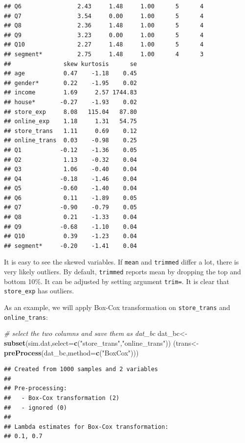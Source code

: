 \documentclass[12pt,]{krantz}
\newenvironment{Shaded}{\begin{snugshade}}{\end{snugshade}}
\newcommand{\KeywordTok}[1]{\textcolor[rgb]{0.13,0.29,0.53}{\textbf{{#1}}}}
\newcommand{\DataTypeTok}[1]{\textcolor[rgb]{0.13,0.29,0.53}{{#1}}}
\newcommand{\StringTok}[1]{\textcolor[rgb]{0.31,0.60,0.02}{{#1}}}
\newcommand{\CommentTok}[1]{\textcolor[rgb]{0.56,0.35,0.01}{\textit{{#1}}}}
\newcommand{\NormalTok}[1]{{#1}}
\theoremstyle{definition}
\theoremstyle{definition}
\theoremstyle{remark}
\begin{document}
\begin{verbatim}
## Q6                2.43     1.48     1.00      5      4
## Q7                3.54     0.00     1.00      5      4
## Q8                2.36     1.48     1.00      5      4
## Q9                3.23     0.00     1.00      5      4
## Q10               2.27     1.48     1.00      5      4
## segment*          2.75     1.48     1.00      4      3
##               skew kurtosis      se
## age           0.47    -1.18    0.45
## gender*       0.22    -1.95    0.02
## income        1.69     2.57 1744.83
## house*       -0.27    -1.93    0.02
## store_exp     8.08   115.04   87.80
## online_exp    1.18     1.31   54.75
## store_trans   1.11     0.69    0.12
## online_trans  0.03    -0.98    0.25
## Q1           -0.12    -1.36    0.05
## Q2            1.13    -0.32    0.04
## Q3            1.06    -0.40    0.04
## Q4           -0.18    -1.46    0.04
## Q5           -0.60    -1.40    0.04
## Q6            0.11    -1.89    0.05
## Q7           -0.90    -0.79    0.05
## Q8            0.21    -1.33    0.04
## Q9           -0.68    -1.10    0.04
## Q10           0.39    -1.23    0.04
## segment*     -0.20    -1.41    0.04
\end{verbatim}

It is easy to see the skewed variables. If \texttt{mean} and
\texttt{trimmed} differ a lot, there is very likely outliers. By
default, \texttt{trimmed} reports mean by dropping the top and bottom
10\%. It can be adjusted by setting argument \texttt{trim=}. It is clear
that \texttt{store\_exp} has outliers.

As an example, we will apply Box-Cox transformation on
\texttt{store\_trans} and \texttt{online\_trans}:

\begin{Shaded}
\begin{Highlighting}[]
\CommentTok{# select the two columns and save them as dat_bc}
\NormalTok{dat_bc<-}\KeywordTok{subset}\NormalTok{(sim.dat,}\DataTypeTok{select=}\KeywordTok{c}\NormalTok{(}\StringTok{"store_trans"}\NormalTok{,}\StringTok{"online_trans"}\NormalTok{))}
\NormalTok{(trans<-}\KeywordTok{preProcess}\NormalTok{(dat_bc,}\DataTypeTok{method=}\KeywordTok{c}\NormalTok{(}\StringTok{"BoxCox"}\NormalTok{)))}
\end{Highlighting}
\end{Shaded}

\begin{verbatim}
## Created from 1000 samples and 2 variables
## 
## Pre-processing:
##   - Box-Cox transformation (2)
##   - ignored (0)
## 
## Lambda estimates for Box-Cox transformation:
## 0.1, 0.7
\end{verbatim}
\end{document}
